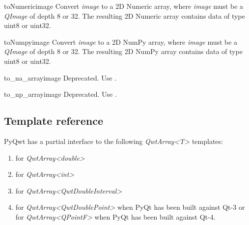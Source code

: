 \documentclass[a4paper,10pt,english]{manual}
\begin{document}
\hypertarget{PyQt4.Qwt5.toNumeric}{}\begin{funcdesc}{toNumeric}{image}
Convert \emph{image} to a 2D Numeric array, where \emph{image} must be a
\emph{QImage} of depth 8 or 32.  The resulting 2D Numeric array
contains data of type uint8 or uint32.
\end{funcdesc}

\hypertarget{PyQt4.Qwt5.toNumpy}{}\begin{funcdesc}{toNumpy}{image}
Convert \emph{image} to a 2D NumPy array, where \emph{image} must be a
\emph{QImage} of depth 8 or 32.  The resulting 2D NumPy array
contains data of type uint8 or uint32.
\end{funcdesc}

\hypertarget{PyQt4.Qwt5.to_na_array}{}\begin{funcdesc}{to\_na\_array}{image}
Deprecated. Use \hyperlink{PyQt4.Qwt5.toNumarray}{}.
\end{funcdesc}

\hypertarget{PyQt4.Qwt5.to_np_array}{}\begin{funcdesc}{to\_np\_array}{image}
Deprecated. Use \hyperlink{PyQt4.Qwt5.toNumeric}{}.
\end{funcdesc}


\subsection{Template reference}

PyQwt has a partial interface to the following \emph{QwtArray\textless{}T\textgreater{}} templates:
\begin{enumerate}
\item {} 
\hyperlink{PyQt4.Qwt5.QwtArrayDouble}{} for \emph{QwtArray\textless{}double\textgreater{}}

\item {} 
\hyperlink{PyQt4.Qwt5.QwtArrayInt}{} for \emph{QwtArray\textless{}int\textgreater{}}

\item {} 
\hyperlink{PyQt4.Qwt5.QwtArrayQwtDoubleInterval}{} for \emph{QwtArray\textless{}QwtDoubleInterval\textgreater{}}

\item {} 
\hyperlink{PyQt4.Qwt5.QwtArrayQwtDoublePoint}{} for \emph{QwtArray\textless{}QwtDoublePoint\textgreater{}}
when PyQt has been built against Qt-3 or for \emph{QwtArray\textless{}QPointF\textgreater{}} when
PyQt has been built against Qt-4.

\end{enumerate}
\end{document}
